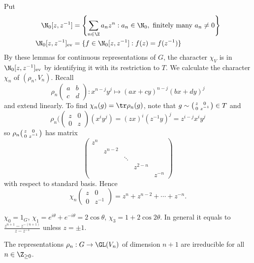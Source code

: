 \documentclass[a4paper]{article}
\theoremstyle{definition}
\begin{document}
Put
\begin{align*}
  \N_0[z, z^{-1}] &= \left\{ \sum_{n \in \Z} a_n z^n: a_n \in \N_0, \text{ finitely many } a_n \neq 0 \right\} \\
  \N_0[z, z^{-1}]_{\text{ev}} &= \{f \in \N_0[z, z^{-1}]: f(z) = f(z^{-1})\}
\end{align*}
By these lemmas for continuous representations of \(G\), the character \(\chi_V\) is in \(\N_0[z, z^{-1}]_{\text{ev}}\) by identifying it with its restriction to \(T\). We calculate the character \(\chi_n\) of \((\rho_n, V_n)\). Recall
\[
  \rho_n
  \begin{pmatrix}
    a & b \\
    c & d
  \end{pmatrix}
  : x^{n - j} y^j \mapsto (ax + cy)^{n - j} (bx + dy)^j
\]
and extend linearly. To find \(\chi_n(g) = \tr \rho_n(g)\), note that \(g \sim
\begin{psmallmatrix}
  z & 0 \\
  0 & z^{-1}
\end{psmallmatrix}
\in T\) and
\[
  \rho_n(
  \begin{pmatrix}
    z & 0 \\
    0 & z
  \end{pmatrix}
  (x^i y^j) = (zx)^i (z^{-1} y)^j = z^{i - j} x^i y^j
\]
so \(\rho_n
\begin{psmallmatrix}
  z & 0 \\
  0 & z^{-1}
\end{psmallmatrix}
\) has matrix
\[
  \begin{pmatrix}
    z^n \\
    & z^{n - 2} \\
    & & \ddots \\
    & & & z^{2 - n} \\
    & & & & z^{-n}
  \end{pmatrix}
\]
with respect to standard basis. Hence
\[
  \chi_n
  \begin{pmatrix}
    z & 0 \\
    0 & z^{-1}
  \end{pmatrix}
  = z^n + z^{n - 2} + \cdots + z^{-n}.
\]

\begin{ex}
  \(\chi_0 = 1_G\), \(\chi_1 = e^{i\theta} + e^{-i\theta} = 2 \cos \theta\), \(\chi_3 = 1 + 2 \cos 2\theta\). In general it equals to \(\frac{z^{n + 1} - z^{-(n + 1)}}{z - z^{-1}}\) unless \(z = \pm 1\).
\end{ex}

\begin{theorem}
  The representations \(\rho_n: G \to \GL(V_n)\) of dimension \(n + 1\) are irreducible for all \(n \in \Z_{\geq 0}\).
\end{theorem}
\end{document}
